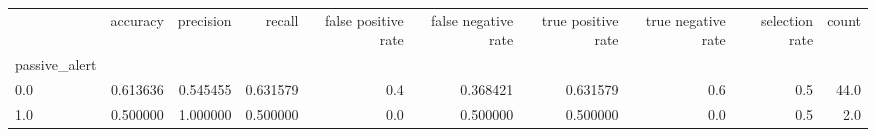 \begin{tabular}{lrrrrrrrrr}
\toprule
{} &  accuracy &  precision &    recall &  false positive rate &  false negative rate &  true positive rate &  true negative rate &  selection rate &  count \\
passive\_alert &           &            &           &                      &                      &                     &                     &                 &        \\
\midrule
0.0           &  0.613636 &   0.545455 &  0.631579 &                  0.4 &             0.368421 &            0.631579 &                 0.6 &             0.5 &   44.0 \\
1.0           &  0.500000 &   1.000000 &  0.500000 &                  0.0 &             0.500000 &            0.500000 &                 0.0 &             0.5 &    2.0 \\
\bottomrule
\end{tabular}
